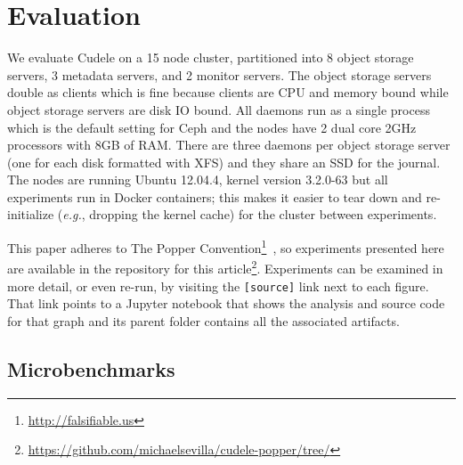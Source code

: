 \section{Evaluation}
\label{sec:evaluation}

We evaluate Cudele on a 15 node cluster, partitioned into 8 object storage
servers, 3 metadata servers, and 2 monitor servers. The object storage servers
double as clients which is fine because clients are CPU and memory bound while
object storage servers are disk IO bound. All daemons run as a single process
which is the default setting for Ceph and the nodes have 2 dual core 2GHz
processors with 8GB of RAM. There are three daemons per object storage server
(one for each disk formatted with XFS) and they share an SSD for the journal.
The nodes are running Ubuntu 12.04.4, kernel version 3.2.0-63 but all
experiments run in Docker containers; this makes it easier to tear down and
re-initialize ({\it e.g.}, dropping the kernel cache) for the cluster between
experiments.

This paper adheres to The Popper
Convention\footnote{\url{http://falsifiable.us}}~\cite{jimenez_popper_2016}, so
experiments presented here are available in the repository for this
article\footnote{\url{https://github.com/michaelsevilla/cudele-popper/tree/}}.
Experiments can be examined in more detail, or even re-run, by visiting the
\texttt{[source]} link next to each figure. That link points to a Jupyter
notebook that shows the analysis and source code for that graph and its parent
folder contains all the associated artifacts.

\subsection{Microbenchmarks}

